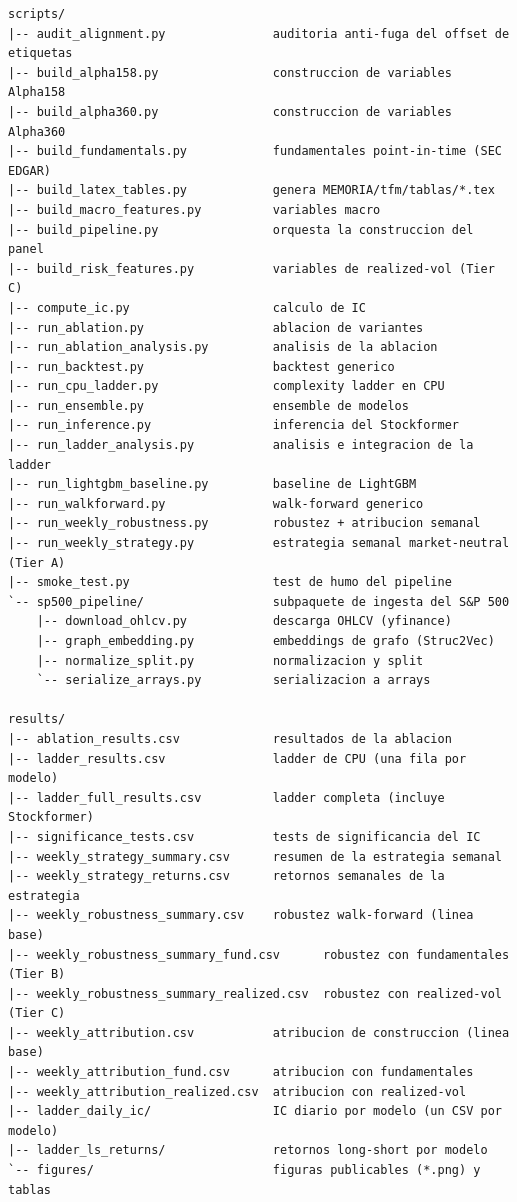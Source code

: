 \begin{verbatim}
scripts/
|-- audit_alignment.py               auditoria anti-fuga del offset de etiquetas
|-- build_alpha158.py                construccion de variables Alpha158
|-- build_alpha360.py                construccion de variables Alpha360
|-- build_fundamentals.py            fundamentales point-in-time (SEC EDGAR)
|-- build_latex_tables.py            genera MEMORIA/tfm/tablas/*.tex
|-- build_macro_features.py          variables macro
|-- build_pipeline.py                orquesta la construccion del panel
|-- build_risk_features.py           variables de realized-vol (Tier C)
|-- compute_ic.py                    calculo de IC
|-- run_ablation.py                  ablacion de variantes
|-- run_ablation_analysis.py         analisis de la ablacion
|-- run_backtest.py                  backtest generico
|-- run_cpu_ladder.py                complexity ladder en CPU
|-- run_ensemble.py                  ensemble de modelos
|-- run_inference.py                 inferencia del Stockformer
|-- run_ladder_analysis.py           analisis e integracion de la ladder
|-- run_lightgbm_baseline.py         baseline de LightGBM
|-- run_walkforward.py               walk-forward generico
|-- run_weekly_robustness.py         robustez + atribucion semanal
|-- run_weekly_strategy.py           estrategia semanal market-neutral (Tier A)
|-- smoke_test.py                    test de humo del pipeline
`-- sp500_pipeline/                  subpaquete de ingesta del S&P 500
    |-- download_ohlcv.py            descarga OHLCV (yfinance)
    |-- graph_embedding.py           embeddings de grafo (Struc2Vec)
    |-- normalize_split.py           normalizacion y split
    `-- serialize_arrays.py          serializacion a arrays

results/
|-- ablation_results.csv             resultados de la ablacion
|-- ladder_results.csv               ladder de CPU (una fila por modelo)
|-- ladder_full_results.csv          ladder completa (incluye Stockformer)
|-- significance_tests.csv           tests de significancia del IC
|-- weekly_strategy_summary.csv      resumen de la estrategia semanal
|-- weekly_strategy_returns.csv      retornos semanales de la estrategia
|-- weekly_robustness_summary.csv    robustez walk-forward (linea base)
|-- weekly_robustness_summary_fund.csv      robustez con fundamentales (Tier B)
|-- weekly_robustness_summary_realized.csv  robustez con realized-vol (Tier C)
|-- weekly_attribution.csv           atribucion de construccion (linea base)
|-- weekly_attribution_fund.csv      atribucion con fundamentales
|-- weekly_attribution_realized.csv  atribucion con realized-vol
|-- ladder_daily_ic/                 IC diario por modelo (un CSV por modelo)
|-- ladder_ls_returns/               retornos long-short por modelo
`-- figures/                         figuras publicables (*.png) y tablas
\end{verbatim}

